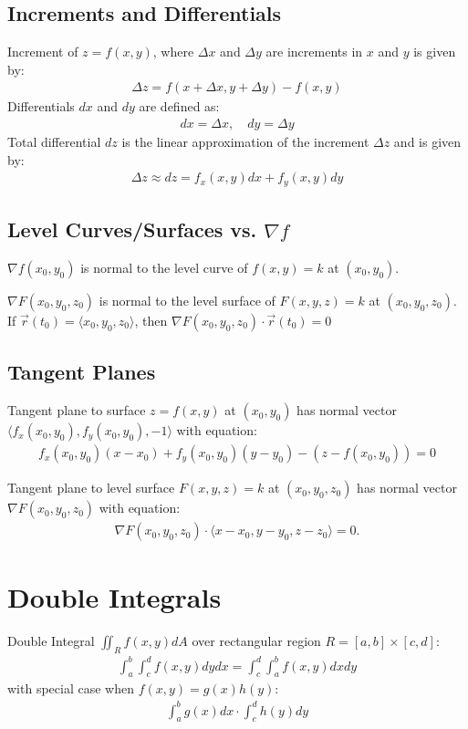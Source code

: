 \documentclass[12pt, a4paper]{article}
\begin{document}
\begin{multicols*}{3}
\subsection{Increments and Differentials}
Increment of $z = f(x, y)$, where $\Delta x$ and $\Delta y$ are increments in $x$ and $y$ is given by:
\begin{align*}
\Delta z = f(x + \Delta x, y + \Delta y) - f(x, y)
\end{align*}
Differentials $dx$ and $dy$ are defined as:
\begin{align*}
dx = \Delta x, \quad dy = \Delta y
\end{align*}
Total differential $dz$ is the linear approximation of the increment $\Delta z$ and is given by:
\begin{align*}
\Delta z \approx dz = f_x(x, y) dx + f_y(x, y) dy
\end{align*}

\subsection{Level Curves/Surfaces vs. $\nabla f$}
$\nabla f(x_0, y_0)$ is normal to the level curve of $f(x,y) = k$ at $(x_0,y_0)$.

$\nabla F(x_0, y_0, z_0)$ is normal to the level surface of $F(x,y,z) = k$ at $(x_0,y_0,z_0)$.\\
If $\vec{r}(t_0) = \langle x_0, y_0, z_0 \rangle$, then $\nabla F(x_0, y_0, z_0)\cdot \vec{r}(t_0) = 0$

\subsection{Tangent Planes}
Tangent plane to surface $z = f(x, y)$ at $(x_0, y_0)$ has normal vector $\langle f_x(x_0, y_0), f_y(x_0, y_0), -1 \rangle$ with equation:
\begin{align*}
f_x(x_0, y_0)(x - x_0) + f_y(x_0, y_0)(y - y_0) - (z - f(x_0, y_0)) = 0
\end{align*}

Tangent plane to level surface $F(x, y, z) = k$ at $ (x_0, y_0, z_0)$ has normal vector $\nabla F(x_0, y_0, z_0)$ with equation:
\begin{align*}
\nabla F(x_0, y_0, z_0) \cdot \langle x - x_0, y - y_0, z - z_0 \rangle = 0.
\end{align*}
\colbreak

\section{Double Integrals}
Double Integral $\displaystyle \iint_R f(x,y)dA$ over rectangular region $R = [a,b]\times[c,d]$:
\begin{align*}
  \int^b_a\int^d_c f(x,y)dydx = \int^d_c\int^b_af(x,y)dxdy
\end{align*}
with special case when $f(x,y) = g(x)h(y)$:
\begin{align*}
  \int^b_a g(x)dx \cdot \int^d_ch(y)dy
\end{align*}


\end{multicols*}
\end{document}
